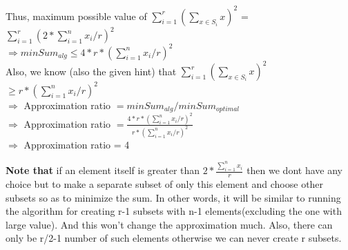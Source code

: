 \documentclass[11pt]{article}
\begin{document}
\begin{enumerate}
    Thus, maximum possible value of $\sum_{i=1}^r (\sum_{x \in S_i} x)^2$ = $\sum_{i=1}^r (2*\sum_{i=1}^n x_i/r)^2$ \\
    $\Longrightarrow minSum_{alg} \leq 4*r*(\sum_{i=1}^n x_i/r)^2$ \\
    Also, we know (also the given hint) that $\sum_{i=1}^r (\sum_{x \in S_i} x)^2$ $\geq r*(\sum_{i=1}^n x_i/r)^2$ \\
    $\Longrightarrow$ Approximation ratio $= minSum_{alg}/minSum_{optimal}$ \\
    $\Longrightarrow$ Approximation ratio $=  \frac{4*r*(\sum_{i=1}^n x_i/r)^2}{r*(\sum_{i=1}^n x_i/r)^2}$\\
    $\Longrightarrow$ Approximation ratio = 4
    
    \textbf{Note that} if an element itself is greater than $2*\frac{\sum_{i=1}^n x_i}{r}$ then we dont have any choice but to make a separate subset of only this element and choose other subsets so as to minimize the sum. In other words, it will be similar to running the algorithm for creating r-1 subsets with n-1 elements(excluding the one with large value). And this won't change the approximation much. Also, there can only be r/2-1 number of such elements otherwise we can never create r subsets.
\end{enumerate}
\newpage
\end{document}
